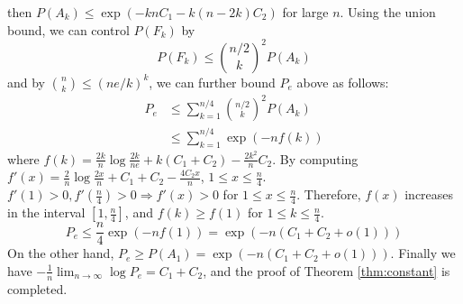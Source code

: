 \documentclass[conference,letterpaper]{IEEEtran}
\begin{document}
then $
P(A_k) \leq \exp(-knC_1-k(n-2k) C_2)
$ for large $n$.
Using the union bound,
we can control $P(F_k)$ by
\begin{equation}\label{eq:FAk}
P(F_k) \leq \binom{n/2}{k}^2 P(A_k)
\end{equation}
and by $\binom{n}{k} \leq (ne/k)^k$,
we can further bound $P_e$ above as follows:
\begin{align*}
P_e & \leq \sum_{k=1}^{n/4} \binom{n/2}{k}^2 P(A_k) \\
& \leq \sum_{k=1}^{n/4} \exp(-nf(k))
\end{align*}
where
$f(k) = \frac{2k}{n}\log \frac{2k}{ne} + k(C_1+C_2) - \frac{2k^2}{n}C_2$.
By computing $f'(x)= \frac{2}{n} \log \frac{2x}{n} + C_1+C_2 - \frac{4C_2x}{n}$, $1\leq x \leq \frac{n}{4}$.
$f'(1) > 0 , f'(\frac{n}{4}) > 0 \Rightarrow f'(x) > 0$ for $1\leq x \leq \frac{n}{4}$.
Therefore, $f(x)$ increases in the interval $[1, \frac{n}{4}]$, and $f(k) \geq f(1)$ for $1\leq k \leq \frac{n}{4}$.
\begin{equation}
P_e \leq \frac{n}{4}\exp(-nf(1)) = \exp(-n (C_1+C_2+o(1)))
\end{equation}
On the other hand, $P_e \geq P(A_1) = \exp(-n(C_1+C_2+o(1)))$.
Finally we have
$-\frac{1}{n} \lim_{n \to \infty} \log P_e = C_1+C_2$,
and the proof of Theorem \ref{thm:constant} is completed.
\end{document}
